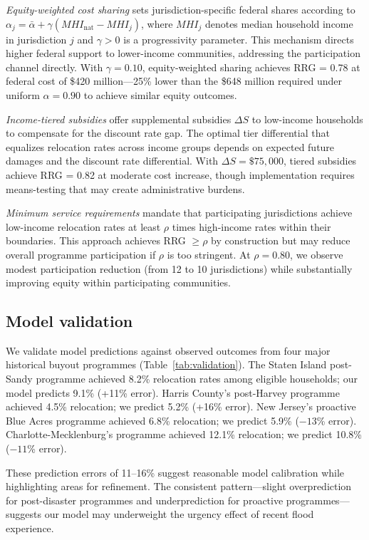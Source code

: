 \documentclass[11pt,letterpaper]{article}
\theoremstyle{definition}
\begin{document}
\textit{Equity-weighted cost sharing} sets jurisdiction-specific federal shares according to $\alpha_j = \bar{\alpha} + \gamma(MHI_{\text{nat}} - MHI_j)$, where $MHI_j$ denotes median household income in jurisdiction $j$ and $\gamma > 0$ is a progressivity parameter. This mechanism directs higher federal support to lower-income communities, addressing the participation channel directly. With $\gamma = 0.10$, equity-weighted sharing achieves RRG = 0.78 at federal cost of \$420 million---25\% lower than the \$648 million required under uniform $\alpha = 0.90$ to achieve similar equity outcomes.

\textit{Income-tiered subsidies} offer supplemental subsidies $\Delta S$ to low-income households to compensate for the discount rate gap. The optimal tier differential that equalizes relocation rates across income groups depends on expected future damages and the discount rate differential. With $\Delta S = \$75,000$, tiered subsidies achieve RRG = 0.82 at moderate cost increase, though implementation requires means-testing that may create administrative burdens.

\textit{Minimum service requirements} mandate that participating jurisdictions achieve low-income relocation rates at least $\rho$ times high-income rates within their boundaries. This approach achieves RRG $\geq \rho$ by construction but may reduce overall programme participation if $\rho$ is too stringent. At $\rho = 0.80$, we observe modest participation reduction (from 12 to 10 jurisdictions) while substantially improving equity within participating communities.

\subsection*{Model validation}

We validate model predictions against observed outcomes from four major historical buyout programmes (Table~\ref{tab:validation}). The Staten Island post-Sandy programme achieved 8.2\% relocation rates among eligible households; our model predicts 9.1\% (+11\% error). Harris County's post-Harvey programme achieved 4.5\% relocation; we predict 5.2\% (+16\% error). New Jersey's proactive Blue Acres programme achieved 6.8\% relocation; we predict 5.9\% ($-13$\% error). Charlotte-Mecklenburg's programme achieved 12.1\% relocation; we predict 10.8\% ($-11$\% error).

These prediction errors of 11--16\% suggest reasonable model calibration while highlighting areas for refinement. The consistent pattern---slight overprediction for post-disaster programmes and underprediction for proactive programmes---suggests our model may underweight the urgency effect of recent flood experience.
\end{document}
